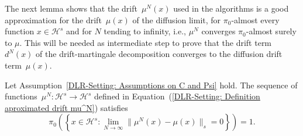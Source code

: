 The next lemma shows that the drift~$\mu^N(x)$ used in the algorithms is a good approximation for the drift~$\mu(x)$ of the diffusion limit, for $\pi_0$-almost every function $x \in \mathcal{H}^s$ and for $N$ tending to infinity, i.e., $\mu^N$ converges $\pi_0$-almost surely to $\mu$. This will be needed as intermediate step to prove that the drift term~$d^N(x)$ of the drift-martingale decomposition converges to the diffusion drift term~$\mu(x)$.

\begin{lemma}\autocite[Lemma 4.1]{Pillai2012}
 \label{DLR: Proof Lemma mu^N converges to mu}
 Let Assumption~\ref{DLR-Setting: Assumptions on C and Psi} hold. The sequence of functions~$\mu^N: \mathcal{H}^s \to \mathcal{H}^s$ defined in Equation~(\ref{DLR-Setting: Definition aproximated drift mu^N}) satisfies
 \begin{equation*}
   \pi_0 \left(  \left\{  x \in \mathcal{H}^s : \lim_{N \to \infty} \| \mu^N(x) - \mu(x) \|_s =0  \right\}  \right) = 1.
 \end{equation*}

\end{lemma}

